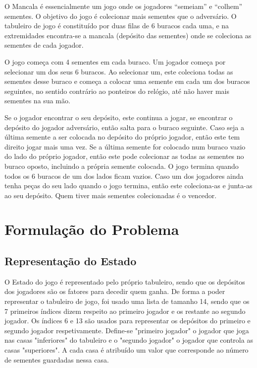 \documentclass[conference]{IEEEtran}
\begin{document}
O Mancala \'e essencialmente um jogo onde os jogadores “semeiam” e “colhem” sementes\cite{b1}.
O objetivo do jogo \'e colecionar mais sementes que o advers\'ario.
O tabuleiro de jogo \'e constituído por duas filas de 6 buracos cada uma, e na extremidades encontra-se  a mancala (dep\'osito das sementes) onde se coleciona as sementes de cada jogador.

O jogo começa com 4 sementes em cada buraco. Um jogador começa por selecionar um dos seus 6 buracos. Ao selecionar um, este coleciona todas as sementes desse buraco e começa a colocar uma semente em cada um dos buracos seguintes, no sentido contr\'ario ao ponteiros do rel\'ogio, at\'e n\~ao haver mais sementes na sua m\~ao.

Se o jogador encontrar o seu dep\'osito, este continua a jogar, se encontrar o dep\'osito do jogador advers\'ario, ent\~ao salta para o buraco seguinte. Caso seja a \'ultima semente a ser colocada no dep\'osito do pr\'oprio jogador, ent\~ao este tem direito jogar mais uma vez.
Se a \'ultima semente for colocado num buraco vazio do lado do pr\'oprio jogador, ent\~ao este pode colecionar as todas as sementes no buraco oposto, incluindo a pr\'opria semente colocada.
O jogo termina quando todos os 6 buracos de um dos lados ficam vazios. Caso um dos jogadores ainda tenha peças do seu lado quando o jogo termina, ent\~ao este coleciona-as e junta-as ao seu dep\'osito. 
Quem tiver mais sementes colecionadas \'e o vencedor.


\section{Formula\c c\~ao do Problema}

\subsection{Representação do Estado}
O Estado do jogo é representado pelo próprio tabuleiro, sendo que os depósitos dos jogadores são os fatores para decedir quem ganha.
De forma a poder representar o tabuleiro de jogo, foi usado uma lista de tamanho 14, sendo que os 7 primeiros índices dizem respeito ao primeiro jogador e os restante ao segundo jogador.
Os índices 6 e 13 são usados para representar os depósitos do primeiro e segundo jogador respetivamente. Define-se "primeiro jogador" o jogador que joga nas casas "inferiores" do tabuleiro e o "segundo jogador" o jogador que controla as casas "superiores".
A cada casa é atribuído um valor que corresponde ao número de sementes guardadas nessa casa.\\
\end{document}
